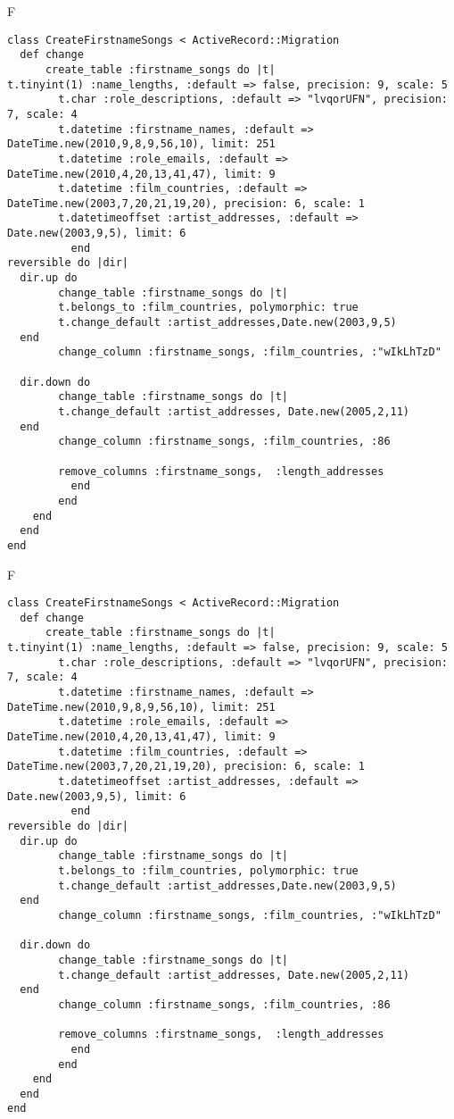 F
\begin{verbatim}
class CreateFirstnameSongs < ActiveRecord::Migration
  def change
	  create_table :firstname_songs do |t|
t.tinyint(1) :name_lengths, :default => false, precision: 9, scale: 5
		t.char :role_descriptions, :default => "lvqorUFN", precision: 7, scale: 4
		t.datetime :firstname_names, :default => DateTime.new(2010,9,8,9,56,10), limit: 251
		t.datetime :role_emails, :default => DateTime.new(2010,4,20,13,41,47), limit: 9
		t.datetime :film_countries, :default => DateTime.new(2003,7,20,21,19,20), precision: 6, scale: 1
		t.datetimeoffset :artist_addresses, :default => Date.new(2003,9,5), limit: 6
		  end
reversible do |dir|
  dir.up do
		change_table :firstname_songs do |t|
		t.belongs_to :film_countries, polymorphic: true
 		t.change_default :artist_addresses,Date.new(2003,9,5)
  end
 		change_column :firstname_songs, :film_countries, :"wIkLhTzD"
   
  dir.down do
		change_table :firstname_songs do |t|
		t.change_default :artist_addresses, Date.new(2005,2,11)
  end
 		change_column :firstname_songs, :film_countries, :86
   
		remove_columns :firstname_songs,  :length_addresses 
	      end
	    end
    end 
  end
end

\end{verbatim}

F
\begin{verbatim}
class CreateFirstnameSongs < ActiveRecord::Migration
  def change
	  create_table :firstname_songs do |t|
t.tinyint(1) :name_lengths, :default => false, precision: 9, scale: 5
		t.char :role_descriptions, :default => "lvqorUFN", precision: 7, scale: 4
		t.datetime :firstname_names, :default => DateTime.new(2010,9,8,9,56,10), limit: 251
		t.datetime :role_emails, :default => DateTime.new(2010,4,20,13,41,47), limit: 9
		t.datetime :film_countries, :default => DateTime.new(2003,7,20,21,19,20), precision: 6, scale: 1
		t.datetimeoffset :artist_addresses, :default => Date.new(2003,9,5), limit: 6
		  end
reversible do |dir|
  dir.up do
		change_table :firstname_songs do |t|
		t.belongs_to :film_countries, polymorphic: true
 		t.change_default :artist_addresses,Date.new(2003,9,5)
  end
 		change_column :firstname_songs, :film_countries, :"wIkLhTzD"
   
  dir.down do
		change_table :firstname_songs do |t|
		t.change_default :artist_addresses, Date.new(2005,2,11)
  end
 		change_column :firstname_songs, :film_countries, :86
   
		remove_columns :firstname_songs,  :length_addresses 
	      end
	    end
    end 
  end
end

\end{verbatim}

